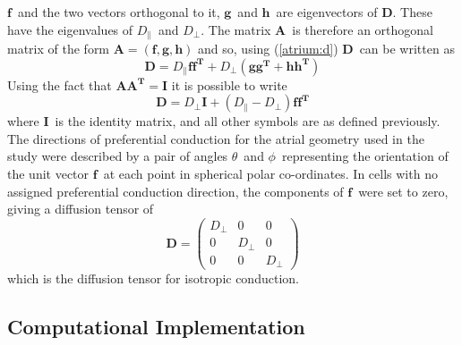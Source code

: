 $\mathbf{f}$\ and the two vectors orthogonal to it, $\mathbf{g}$\ and
$\mathbf{h}$\ are eigenvectors of $\mathbf{D}$.
These have the eigenvalues of $D_{\parallel}$\ and $D_{\perp}$.
The matrix $\mathbf{A}$\ is therefore an orthogonal matrix of the form
$\mathbf{A} = \left(\mathbf{f},\mathbf{g},\mathbf{h}\right)$ and so, using
(\ref{atrium:d}) $\mathbf{D}$\ can be written as
\begin{equation}
\label{atrium:dfgh}
\mathbf{D} = D_{\parallel}\mathbf{f}\mathbf{f^{T}} +
D_{\perp}\left(\mathbf{g}\mathbf{g^{T}} + \mathbf{h}\mathbf{h^{T}}\right)
\end{equation}
Using the fact that $\mathbf{A}\mathbf{A^T} = \mathbf{I}$ it is possible to
write
\begin{equation}
\label{atrium:dwithf}
\mathbf{D} = D_{\perp}\mathbf{I} + \left(D_{\parallel}-D_{\perp}\right)\mathbf{f}\mathbf{f^{T}}
\end{equation}
where $\mathbf{I}$\ is the identity matrix, and all other symbols are as defined
previously.
The directions of preferential conduction for the atrial geometry used in the
study were described by a pair of angles $\theta$\ and $\phi$\ representing the
orientation of the unit vector $\mathbf{f}$\ at each point in spherical polar
co-ordinates.
In cells with no assigned preferential conduction direction, the components of
$\mathbf{f}$\ were set to zero, giving a diffusion tensor of
\begin{equation}
\label{atrium:dnofibre}
\mathbf{D} =
\begin{pmatrix}
D_{\perp} & 0 & 0\\
0 & D_{\perp} & 0\\
0 & 0 & D_{\perp}
\end{pmatrix}
\end{equation}
which is the diffusion tensor for isotropic conduction.

\subsection{Computational Implementation}

